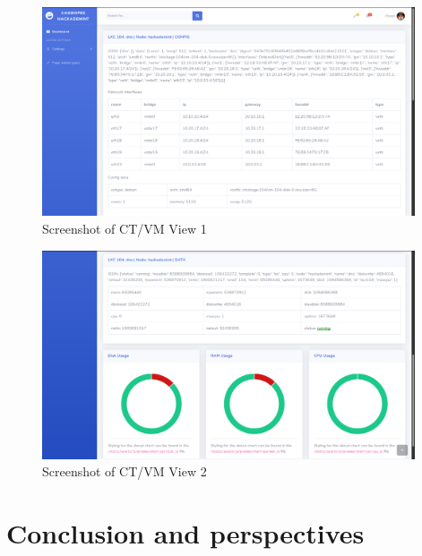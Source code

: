 \begin{figure}[!h]
  \centering
  \includegraphics[width=0.98\textwidth]{images/flask-application-2.png}
  \caption{Screenshot of CT/VM View 1}
  \label{CTView}
\end{figure}

\begin{figure}[!h]
  \centering
  \includegraphics[width=0.98\textwidth]{images/flask-application-3.png}
  \caption{Screenshot of CT/VM View 2}
  \label{CTView2}
\end{figure}

\pagebreak

\section{Conclusion and perspectives}


